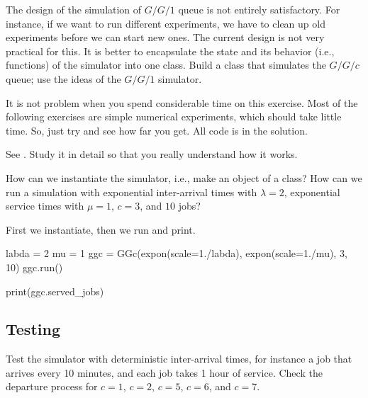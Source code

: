 \begin{exercise}
  The design of the simulation of $G/G/1$ queue is not entirely satisfactory. For instance, if we want to run different experiments, we have to clean up old experiments before we can start new ones. The current design is not very practical for this. It is better to encapsulate the state and its behavior (i.e., functions) of the simulator into one class. Build a class that simulates the $G/G/c$ queue; use the ideas of the $G/G/1$ simulator.

It is not  problem when you spend considerable time on this exercise. Most of the following exercises are simple numerical experiments, which should take little time. So, just try and see how far you get. All code is in the solution.

\begin{solution}
See . Study it in detail so that you really understand how it works. 
\end{solution}
  
\end{exercise}
      

\begin{exercise}

How can we instantiate the  simulator, i.e., make an object of a class? How can we run a simulation with exponential inter-arrival times with $\lambda=2$, exponential service times with $\mu=1$, $c=3$, and $10$ jobs?
\begin{solution}
First we instantiate, then we run and print. 
\begin{pyverbatim}
labda = 2
mu = 1  
ggc = GGc(expon(scale=1./labda), expon(scale=1./mu), 3, 10)
ggc.run()

print(ggc.served_jobs)
\end{pyverbatim}
\end{solution}
\end{exercise}

\subsection{Testing}
\label{sec:testing-1}

\begin{exercise}
Test the simulator with deterministic inter-arrival times, for instance a job that arrives every 10 minutes, and each job takes 1 hour of service. Check the departure process for $c=1$, $c=2$, $c=5$, $c=6$, and $c=7$. 
\end{exercise}

